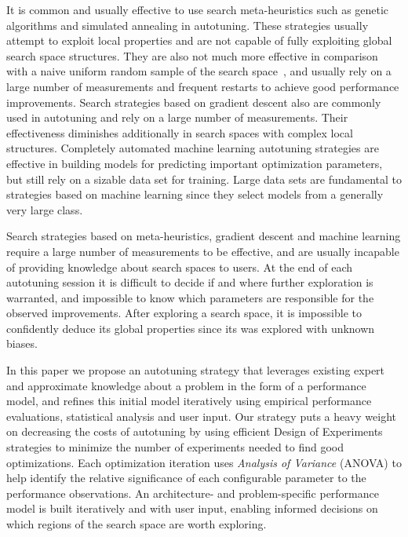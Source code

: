 \documentclass[conference]{IEEEtran}
\begin{document}
It is common and usually effective to use search meta-heuristics such as genetic
algorithms and simulated annealing in autotuning. These strategies usually
attempt to exploit local properties and are not capable of fully exploiting
global search space structures. They are also not much more effective in
comparison with a naive uniform random sample of the search
space~\cite{seymour2008comparison,knijnenburg2003combined}, and usually rely on a
large number of measurements and frequent restarts to achieve good performance
improvements. Search strategies based on gradient descent also are commonly used
in autotuning and rely on a large number of measurements. Their effectiveness
diminishes additionally in search spaces with complex local structures.
Completely automated machine learning autotuning strategies are effective in
building models for predicting important optimization parameters, but still rely
on a sizable data set for training. Large data sets are fundamental to
strategies based on machine learning since they select models from a generally
very large class.

Search strategies based on meta-heuristics, gradient descent and machine
learning require a large number of measurements to be effective, and are usually
incapable of providing knowledge about search spaces to users. At the end of
each autotuning session it is difficult to decide if and where further
exploration is warranted, and impossible to know which parameters are
responsible for the observed improvements. After exploring a search space, it is
impossible to confidently deduce its global properties since its was explored
with unknown biases.

In this paper we propose an autotuning strategy that leverages existing expert
and approximate knowledge about a problem in the form of a performance model,
and refines this initial model iteratively using empirical performance
evaluations, statistical analysis and user input. Our strategy puts a heavy
weight on decreasing the costs of autotuning by using efficient Design of
Experiments strategies to minimize the number of experiments needed to find good
optimizations. Each optimization iteration uses \emph{Analysis of Variance} (ANOVA)
to help identify the relative significance of each configurable parameter to the
performance observations. An architecture- and problem-specific performance
model is built iteratively and with user input, enabling informed decisions on
which regions of the search space are worth exploring.
\end{document}
